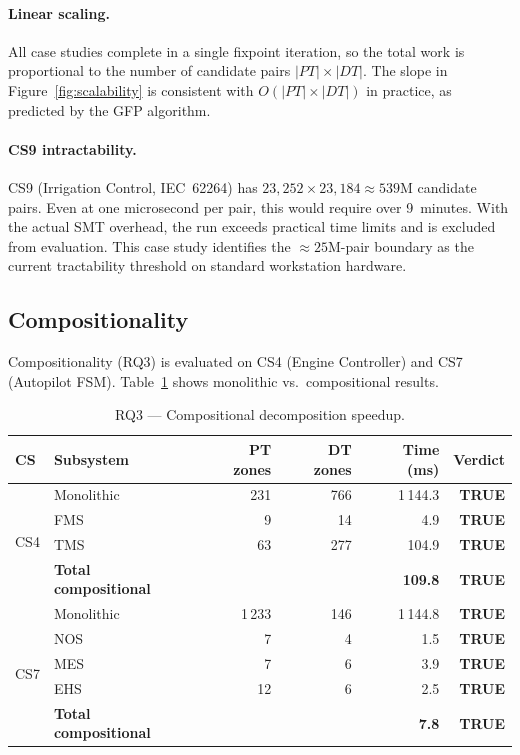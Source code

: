 \documentclass[10pt,a4paper]{article}
\newcommand{\OK}{\textcolor{okgreen}{\textbf{TRUE}}}
\begin{document}
\paragraph{Linear scaling.}
All case studies complete in a single fixpoint iteration, so the total work
is proportional to the number of candidate pairs $|PT| \times |DT|$.
The slope in Figure~\ref{fig:scalability} is consistent with $O(|PT| \times |DT|)$
in practice, as predicted by the GFP algorithm.

\paragraph{CS9 intractability.}
CS9 (Irrigation Control, IEC~62264) has $23{,}252 \times 23{,}184 \approx 539\text{M}$
candidate pairs. Even at one microsecond per pair, this would require over
9~minutes. With the actual SMT overhead, the run exceeds practical time limits
and is excluded from evaluation. This case study identifies the
$\approx 25\text{M}$-pair boundary as the current tractability threshold on
standard workstation hardware.

\subsection{Compositionality}

Compositionality (RQ3) is evaluated on CS4 (Engine Controller) and CS7
(Autopilot FSM). Table~\ref{tab:rq3_comp} shows monolithic vs.\ compositional
results.

\begin{table}[htbp]
\centering
\caption{RQ3 — Compositional decomposition speedup.}
\label{tab:rq3_comp}
\small
\begin{tabular}{@{}llrrrr@{}}
\toprule
\textbf{CS} & \textbf{Subsystem} & \textbf{PT zones} & \textbf{DT zones}
            & \textbf{Time (ms)} & \textbf{Verdict} \\
\midrule
\multirow{4}{*}{CS4} & Monolithic       & 231  & 766  & 1\,144.3 & \OK \\
                     & FMS              &   9  &  14  &      4.9 & \OK \\
                     & TMS              &  63  & 277  &    104.9 & \OK \\
                     & \textbf{Total compositional} & & & \textbf{109.8} & \OK \\
\midrule
\multirow{5}{*}{CS7} & Monolithic       & 1\,233 & 146 & 1\,144.8 & \OK \\
                     & NOS              &   7  &   4  &      1.5 & \OK \\
                     & MES              &   7  &   6  &      3.9 & \OK \\
                     & EHS              &  12  &   6  &      2.5 & \OK \\
                     & \textbf{Total compositional} & & &  \textbf{7.8} & \OK \\
\midrule
\end{tabular}
\end{table}
\end{document}
